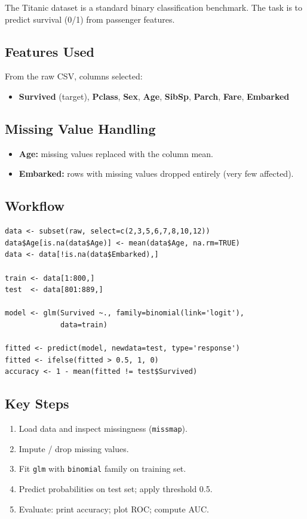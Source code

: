 \documentclass[11pt]{article}
\begin{document}
The Titanic dataset is a standard binary classification benchmark.
The task is to predict survival (0/1) from passenger features.

\subsection{Features Used}
From the raw CSV, columns selected:
\begin{itemize}
    \item \textbf{Survived} (target), \textbf{Pclass}, \textbf{Sex},
      \textbf{Age}, \textbf{SibSp}, \textbf{Parch}, \textbf{Fare},
      \textbf{Embarked}
\end{itemize}

\subsection{Missing Value Handling}
\begin{itemize}
    \item \textbf{Age:} missing values replaced with the column mean.
    \item \textbf{Embarked:} rows with missing values dropped entirely
      (very few affected).
\end{itemize}

\subsection{Workflow}
\begin{verbatim}
data <- subset(raw, select=c(2,3,5,6,7,8,10,12))
data$Age[is.na(data$Age)] <- mean(data$Age, na.rm=TRUE)
data <- data[!is.na(data$Embarked),]

train <- data[1:800,]
test  <- data[801:889,]

model <- glm(Survived ~., family=binomial(link='logit'),
             data=train)

fitted <- predict(model, newdata=test, type='response')
fitted <- ifelse(fitted > 0.5, 1, 0)
accuracy <- 1 - mean(fitted != test$Survived)
\end{verbatim}

\subsection{Key Steps}
\begin{enumerate}
    \item Load data and inspect missingness (\texttt{missmap}).
    \item Impute / drop missing values.
    \item Fit \texttt{glm} with \texttt{binomial} family on training set.
    \item Predict probabilities on test set; apply threshold 0.5.
    \item Evaluate: print accuracy; plot ROC; compute AUC.
\end{enumerate}
\end{document}
